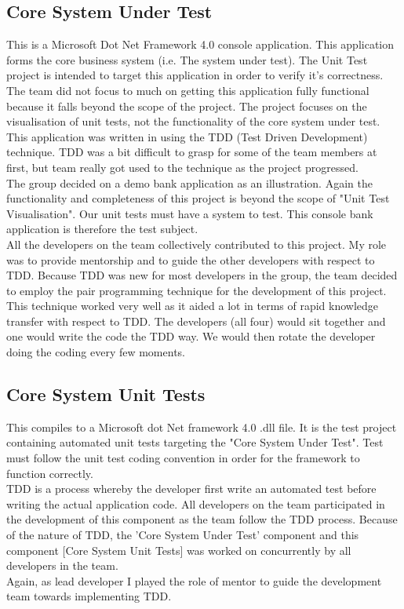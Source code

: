 \documentclass[a4paper,12pt]{article}
\begin{document}
\subsection{Core System Under Test}
This is a Microsoft Dot Net Framework 4.0\cite{dotNetFramework} console application. This application forms the core business system (i.e. The system under test). The Unit Test project is intended to target this application in order to verify it's correctness. The team did not focus to much on getting this application fully functional because it falls beyond the scope of the project. The project focuses on the visualisation of unit tests, not the functionality of the core system under test.\\
\linebreak
This application was written in using the TDD (Test Driven Development\cite{tdd}) technique. TDD was a bit difficult to grasp for some of the team members at first, but team really got used to the technique as the project progressed.\\
\linebreak
The group decided on a demo bank application as an illustration. Again the functionality and completeness of this project is beyond the scope of "Unit Test Visualisation". Our unit tests must have a system to test. This console bank application is therefore the test subject.\\
\linebreak
All the developers on the team collectively contributed to this project. My role was to provide mentorship and to guide the other developers with respect to TDD. Because TDD was new for most developers in the group, the team decided to employ the pair programming\cite{pairprogramming} technique for the development of this project. This technique worked very well as it aided a lot in terms of rapid knowledge transfer with respect to TDD. The developers (all four) would sit together and one would write the code the TDD way. We would then rotate the developer doing the coding every few moments.

\subsection{Core System Unit Tests}
This compiles to a Microsoft dot Net framework 4.0\cite{dotNetFramework} .dll file. It is the test project containing automated unit tests targeting the "Core System Under Test". Test must follow the unit test coding convention\cite{codeconvention} in order for the framework to function correctly.\\
\linebreak
TDD is a process whereby the developer first write an automated test before writing the actual application code. All developers on the team participated in the development of this component as the team follow the TDD process. Because of the nature of TDD, the 'Core System Under Test' component and this component [Core System Unit Tests] was worked on concurrently by all developers in the team.\\
\linebreak
Again, as lead developer I played the role of mentor to guide the development team towards implementing TDD. 
\end{document}
